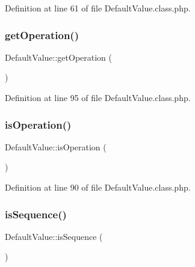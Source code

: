 Definition at line 61 of file Default\+Value.\+class.\+php.

\mbox{\label{classDefaultValue_a1e607abe2e29a00fa3ab0cecba406776}} 
\subsubsection{\texorpdfstring{get\+Operation()}{getOperation()}}
{\footnotesize\ttfamily Default\+Value\+::get\+Operation (\begin{DoxyParamCaption}{ }\end{DoxyParamCaption})}



Definition at line 95 of file Default\+Value.\+class.\+php.

\mbox{\label{classDefaultValue_af7a051370a3b8bb17d9f9cf64a03be74}} 
\subsubsection{\texorpdfstring{is\+Operation()}{isOperation()}}
{\footnotesize\ttfamily Default\+Value\+::is\+Operation (\begin{DoxyParamCaption}{ }\end{DoxyParamCaption})}



Definition at line 90 of file Default\+Value.\+class.\+php.

\mbox{\label{classDefaultValue_a5186ba40cadb8a1740edd64665f4c126}} 
\subsubsection{\texorpdfstring{is\+Sequence()}{isSequence()}}
{\footnotesize\ttfamily Default\+Value\+::is\+Sequence (\begin{DoxyParamCaption}{ }\end{DoxyParamCaption})}



